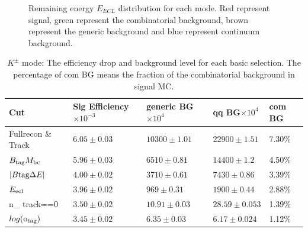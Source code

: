 \begin{figure}[ht]
{		\label{k0sumecl}
	}
\caption{Remaining energy $E_{ECL}$ distribution for each mode. Red represent signal, green represent the combinatorial background,  brown represent the generic background and blue represent continuum background.}
\label{fig:sumecl}	
\end{figure}
\begin{table}[ht]
\small
\begin{center}
\begin{tabular}{ |p{2.2cm}||p{3.6cm}||p{2.8cm}||p{2.1cm}||p{1.3cm}|| }
\hline
 Cut					& Sig Efficiency$\times10^{-3}$  & generic BG$\times10^{4}$&qq BG$\times10^{4}$& com BG \\
\hline
\hline
  Fullrecon \& Track 		& $6.05\pm 0.03 $ 	& $ 10300\pm 1.01 $ 	&  $ 22900\pm1.51$	&7.30\%  \\ %
 \hline
 $B_{\rm{tag}}M_{\rm{bc}} $  		& $5.96\pm 0.03$ 	& $ 6510\pm 0.81 $      & $ 14400\pm1.2 $	&4.50\%\\ %
 \hline
 $ | B{\rm{tag}}\Delta E | $  		& $4.00 \pm 0.02$	& $ 3710\pm 0.61 $	& $  7430\pm0.86 $ 	&3.39\%\\ %
 \hline
 $E_{\rm{ecl}} $			& $3.96\pm 0.02$	& $ 969\pm 0.31$	& $ 1900\pm0.44 $ 	&2.88\%\\ %
 \hline
 n\_ track==0 				& $3.50\pm 0.02$	&$10.91\pm 0.03$	& $28.59\pm0.053$	&1.39\%\\ %
 \hline		
$log(\rm{o_{tag}})$ 			& $3.45\pm 0.02$	&$6.35	\pm 0.03$	& $6.17 \pm0.024$	&1.12\% \\ %
 \hline
\end{tabular}
\caption{$K^\pm$ mode: The efficiency drop and background level for each basic selection. The percentage of com BG means the fraction of the combinatorial background in signal MC. } \label{t:efficiency_k}

\end{center}
\end{table}

